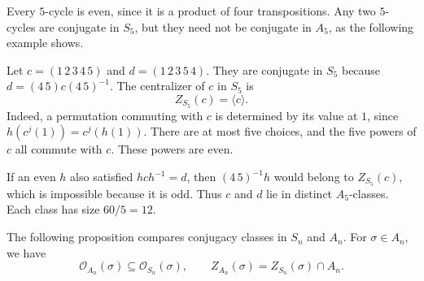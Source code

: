 \documentclass[reqno,11pt]{amsart}
\begin{document}
Every $5$-cycle is even, since it is a product of four transpositions.
Any two $5$-cycles are conjugate in $S_5$, but they need not be conjugate
in $A_5$, as the following example shows.

\begin{example}
	Let $c=(1\,2\,3\,4\,5)$ and $d=(1\,2\,3\,5\,4)$.
	They are conjugate in $S_5$ because $d=(4\,5)c(4\,5)^{-1}$.
	The centralizer of $c$ in $S_5$ is
	\[
	Z_{S_5}(c)=\langle c\rangle.
	\]
	Indeed, a permutation commuting with $c$ is determined by its
	value at $1$, since $h(c^j(1))=c^j(h(1))$. There are at most five
	choices, and the five powers of $c$ all commute with $c$.
	These powers are even.

	If an even $h$ also satisfied $hch^{-1}=d$, then
	$(4\,5)^{-1}h$ would belong to $Z_{S_5}(c)$, which is impossible
	because it is odd. Thus $c$ and $d$ lie in distinct $A_5$-classes.
	Each class has size $60/5=12$.
\end{example}

The following proposition compares conjugacy classes in $S_n$ and $A_n$.
For $\sigma\in A_n$, we have
\[
  \mathcal{O}_{A_n}(\sigma)\subseteq\mathcal{O}_{S_n}(\sigma),\qquad
  Z_{A_n}(\sigma)=Z_{S_n}(\sigma)\cap A_n.
\]
\end{document}

